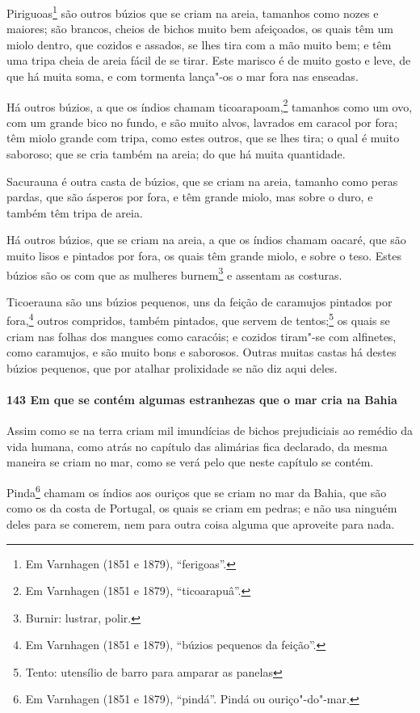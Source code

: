 Piriguoas\footnote{ Em Varnhagen (1851 e 1879), ``ferigoas''.} são outros búzios que se
criam na areia, tamanhos como nozes e maiores; são brancos, cheios de bichos muito bem
afeiçoados, os quais têm um miolo dentro, que cozidos e assados, se lhes tira com a mão
muito bem; e têm uma tripa cheia de areia fácil de se tirar. Este marisco é de muito gosto
e leve, de que há muita soma, e com tormenta lança"-os o mar fora nas enseadas.

Há outros búzios, a que os índios chamam ticoarapoam,\footnote{ Em Varnhagen (1851 e 1879),
``ticoarapuâ''.} tamanhos como um ovo, com um grande bico no fundo, e são muito alvos,
lavrados em caracol por fora; têm miolo grande com tripa, como estes outros, que se lhes
tira; o qual é muito saboroso; que se cria também na areia; do que há muita quantidade.

Sacurauna é outra casta de búzios, que se criam na areia, tamanho como peras pardas, que
são ásperos por fora, e têm grande miolo, mas sobre o duro, e também têm tripa de areia.

Há outros búzios, que se criam na areia, a que os índios chamam oacaré, que são muito
lisos e pintados por fora, os quais têm grande miolo, e sobre o teso. Estes búzios são os
com que as mulheres burnem\footnote{ Burnir: lustrar, polir.} e assentam as costuras.

Ticoerauna são uns búzios pequenos, uns da feição de caramujos pintados por
fora,\footnote{ Em Varnhagen (1851 e 1879), ``búzios pequenos da feição''.} outros
compridos, também pintados, que servem de tentos;\footnote{ Tento: utensílio de barro para
amparar as panelas} os quais se criam nas folhas dos mangues como
caracóis; e cozidos tiram"-se com alfinetes, como caramujos, e são muito bons e saborosos.
Outras muitas castas há destes búzios pequenos, que por atalhar prolixidade se não diz
aqui deles.

\paragraph{143 Em que se contém algumas estranhezas que o mar cria na Bahia}

Assim como se na terra criam mil imundícias de bichos prejudiciais ao remédio da vida
humana, como atrás no capítulo das alimárias fica declarado, da mesma maneira se criam no
mar, como se verá pelo que neste capítulo se contém.

Pinda\footnote{ Em Varnhagen (1851 e 1879), ``pindá''. Pindá ou ouriço"-do"-mar.} chamam os
índios aos ouriços que se criam no mar da Bahia, que são como os da costa de Portugal, os
quais se criam em pedras; e não usa ninguém deles para se comerem, nem para outra coisa
alguma que aproveite para nada.

